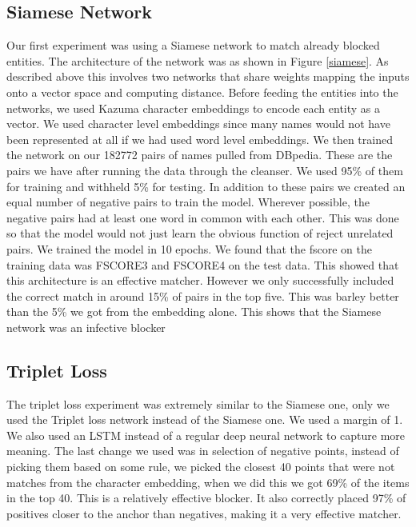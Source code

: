 \subsection{Siamese Network}
Our first experiment was using a Siamese network to match already blocked entities. The architecture of the network was as shown in Figure \ref{siamese}. As described above this involves two networks that share weights mapping the inputs onto a vector space and computing distance. Before feeding the entities into the networks, we used Kazuma character embeddings to encode each entity as a vector. We used character level embeddings since many names would not have been represented at all if we had used word level embeddings. We then trained the network on our 182772 pairs of names pulled from DBpedia. These are the pairs we have after running the data through the cleanser. We used 95\% of them for training and withheld 5\% for testing. In addition to these pairs we created an equal number of negative pairs to train the model. Wherever possible, the negative pairs had at least one word in common with each other. This was done so that the model would not just learn the obvious function of reject unrelated pairs. We trained the model in 10 epochs. We found that the fscore on the training data was FSCORE3 and FSCORE4 on the test data. This showed that this architecture is an effective matcher. However we only successfully included the correct match in around 15\% of pairs in the top five. This was barley better than the 5\% we got from the embedding alone. This shows that the Siamese network was an infective blocker
\subsection{Triplet Loss}
The triplet loss experiment was extremely similar to the Siamese one, only we used the Triplet loss network instead of the Siamese one. We used a margin of 1. We also used an LSTM instead of a regular deep neural network to capture more meaning. The last change we used was in selection of negative points, instead of picking them based on some rule, we picked the closest 40 points that were not matches from the character embedding, when we did this we got 69\% of the items in the top 40. This is a relatively effective blocker. It also correctly placed 97\% of positives closer to the anchor than negatives, making it a very effective matcher.
